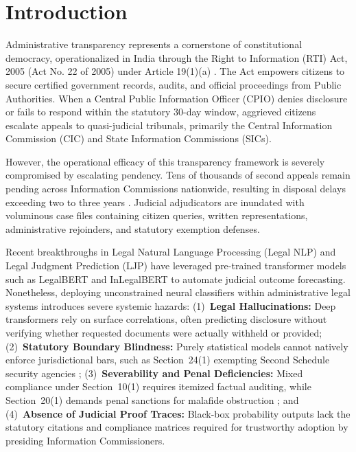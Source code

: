 \documentclass[conference]{IEEEtran}
\begin{document}
\section{Introduction}
Administrative transparency represents a cornerstone of constitutional democracy, operationalized in India through the Right to Information (RTI) Act, 2005 (Act No. 22 of 2005) under Article 19(1)(a) \cite{rajnarain1975}. The Act empowers citizens to secure certified government records, audits, and official proceedings from Public Authorities. When a Central Public Information Officer (CPIO) denies disclosure or fails to respond within the statutory 30-day window, aggrieved citizens escalate appeals to quasi-judicial tribunals, primarily the Central Information Commission (CIC) and State Information Commissions (SICs).

However, the operational efficacy of this transparency framework is severely compromised by escalating pendency. Tens of thousands of second appeals remain pending across Information Commissions nationwide, resulting in disposal delays exceeding two to three years \cite{cicreport2020}. Judicial adjudicators are inundated with voluminous case files containing citizen queries, written representations, administrative rejoinders, and statutory exemption defenses.

Recent breakthroughs in Legal Natural Language Processing (Legal NLP) and Legal Judgment Prediction (LJP) have leveraged pre-trained transformer models such as LegalBERT \cite{chalkidis2020legalbert} and InLegalBERT \cite{paul2023pre} to automate judicial outcome forecasting. Nonetheless, deploying unconstrained neural classifiers within administrative legal systems introduces severe systemic hazards:
(1)~\textbf{Legal Hallucinations:} Deep transformers rely on surface correlations, often predicting disclosure without verifying whether requested documents were actually withheld or provided;
(2)~\textbf{Statutory Boundary Blindness:} Purely statistical models cannot natively enforce jurisdictional bars, such as Section~24(1) exempting Second Schedule security agencies \cite{sudhirkumar2009};
(3)~\textbf{Severability and Penal Deficiencies:} Mixed compliance under Section~10(1) requires itemized factual auditing, while Section~20(1) demands penal sanctions for malafide obstruction \cite{bhamburkar2013}; and
(4)~\textbf{Absence of Judicial Proof Traces:} Black-box probability outputs lack the statutory citations and compliance matrices required for trustworthy adoption by presiding Information Commissioners.
\end{document}

